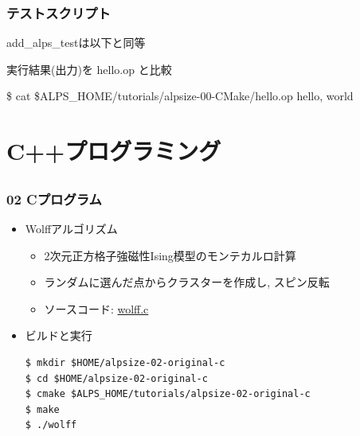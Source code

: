 \begin{frame}
  \frametitle{テストスクリプト}
add\_alps\_testは以下と同等
実行結果(出力)を hello.op と比較
\begin{semiverbatim}
\$ cat \$ALPS_HOME/tutorials/alpsize-00-CMake/hello.op
hello, world
\end{semiverbatim}
\end{frame}

\section{C++プログラミング}
\subsection*{\redm\whitem\greenb}

\begin{frame}[fragile]
  \frametitle{02 Cプログラム}
  \begin{itemize}
    \item Wolffアルゴリズム
      \begin{itemize}
        \item 2次元正方格子強磁性Ising模型のモンテカルロ計算
        \item ランダムに選んだ点からクラスターを作成し, スピン反転
        \item ソースコード: \href{https://github.com/cmsi/alps-tutorial/blob/develop/alpsize/02-wolff.c}{wolff.c}
      \end{itemize}
    \item ビルドと実行
\begin{lstlisting}
$ mkdir $HOME/alpsize-02-original-c
$ cd $HOME/alpsize-02-original-c
$ cmake $ALPS_HOME/tutorials/alpsize-02-original-c
$ make
$ ./wolff
\end{lstlisting}
\end{itemize}
\end{frame}

